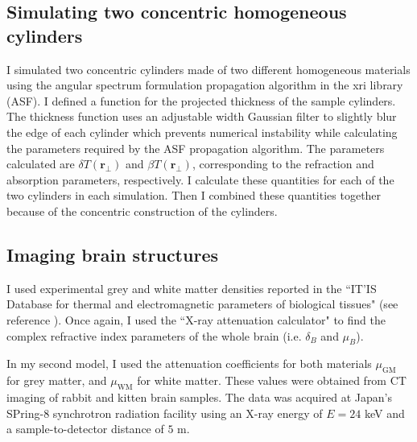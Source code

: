 \documentclass[10pt, a4paper, singlespacing]{report}
\begin{document}

\subsection{Simulating two concentric homogeneous cylinders}\label{2 cylinders}
I simulated two concentric cylinders made of two different homogeneous materials using the angular spectrum formulation propagation algorithm in the xri library (ASF). I defined a function for the projected thickness of the sample cylinders. The thickness function uses an adjustable width Gaussian filter to slightly blur the edge of each cylinder which prevents numerical instability while calculating the parameters required by the ASF propagation algorithm. The parameters calculated are $\delta T(\mathbf{r}_{\perp})$ and $\beta T(\mathbf{r}_{\perp})$, corresponding to the refraction and absorption parameters, respectively. I calculate these quantities for each of the two cylinders in each simulation. Then I combined these quantities together because of the concentric construction of the cylinders.


\subsection{Imaging brain structures}\label{Brainz}
I used experimental grey and white matter densities reported in the ``IT’IS Database for thermal and electromagnetic parameters of biological tissues" (see reference \cite{ITIS}). Once again, I used the ``X-ray attenuation calculator" to find the complex refractive index parameters of the whole brain (i.e. $\delta_B$ and $\mu_B$). 

In my second model, I used the attenuation coefficients for both materials $\mu_{\mathrm{GM}}$ for grey matter, and $\mu_{\mathrm{WM}}$ for white matter. These values were obtained from CT imaging of rabbit and kitten brain samples. The data was acquired at Japan's SPring-8 synchrotron radiation facility using an X-ray energy of $E = 24$ keV and a sample-to-detector distance of $5$ m\cite{Linda}.
\end{document}
